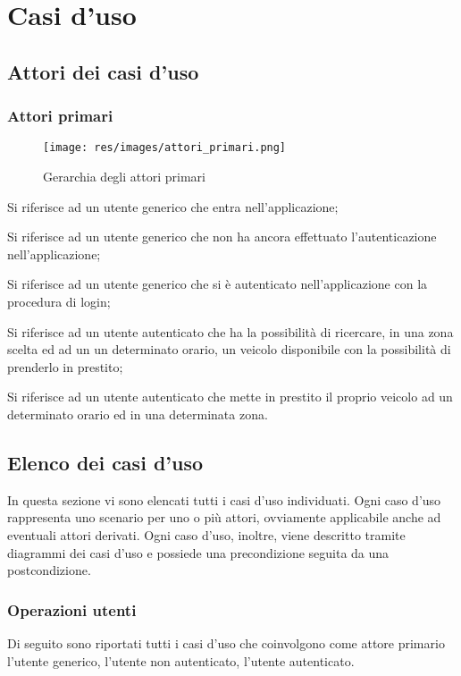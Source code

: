 \section{Casi d'uso} 
\subsection{Attori dei casi d'uso}
\subsubsection{Attori primari}
\begin{figure}[h]
	\texttt{[image: res/images/attori\_primari.png]}
	\centering
	\caption{Gerarchia degli attori primari}
\end{figure}
\begin{description}[style=nextline]
	\item[Utente generico]
	Si riferisce ad un utente generico che entra nell'applicazione;
	\item[Utente non autenticato]
	Si riferisce ad un utente generico che non ha ancora effettuato l'autenticazione nell'applicazione;
	\item[Utente autenticato]
	Si riferisce ad un utente generico che si è autenticato nell'applicazione con la procedura di login;
	\item[Usufruente del veicolo]
	Si riferisce ad un utente autenticato che ha la possibilità di ricercare, in una zona scelta ed ad un un determinato orario, un veicolo disponibile con la possibilità di prenderlo in prestito;
	\item[Proprietario del veicolo]
	Si riferisce ad un utente autenticato che mette in prestito il proprio veicolo ad un determinato orario ed in una determinata zona.	
\end{description}

\subsection{Elenco dei casi d'uso}
In questa sezione vi sono elencati tutti i casi d'uso individuati. Ogni caso d'uso rappresenta uno scenario per uno o più attori, ovviamente applicabile anche ad eventuali attori derivati. Ogni caso d'uso, inoltre, viene descritto tramite diagrammi dei casi d'uso e possiede una precondizione seguita da una postcondizione.
\subsubsection*{Operazioni utenti}
Di seguito sono riportati tutti i casi d'uso che coinvolgono come attore primario l'utente generico, l'utente non autenticato, l'utente autenticato.




\newpage


\newpage






